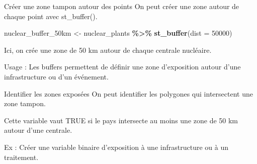 \documentclass[
  10pt,
  ignorenonframetext,
]{beamer}
\newenvironment{Shaded}{\begin{snugshade}}{\end{snugshade}}
\newcommand{\AttributeTok}[1]{\textcolor[rgb]{0.13,0.29,0.53}{#1}}
\newcommand{\DecValTok}[1]{\textcolor[rgb]{0.00,0.00,0.81}{#1}}
\newcommand{\FunctionTok}[1]{\textcolor[rgb]{0.13,0.29,0.53}{\textbf{#1}}}
\newcommand{\NormalTok}[1]{#1}
\newcommand{\OtherTok}[1]{\textcolor[rgb]{0.56,0.35,0.01}{#1}}
\newcommand{\SpecialCharTok}[1]{\textcolor[rgb]{0.81,0.36,0.00}{\textbf{#1}}}
\begin{document}
\begin{frame}[fragile]{Créer une zone tampon autour des points}
\label{cruxe9er-une-zone-tampon-autour-des-points}
On peut créer une zone autour de chaque point avec st\_buffer().

\begin{Shaded}
\begin{Highlighting}[]
\NormalTok{nuclear\_buffer\_50km }\OtherTok{\textless{}{-}}\NormalTok{ nuclear\_plants }\SpecialCharTok{\%\textgreater{}\%}
  \FunctionTok{st\_buffer}\NormalTok{(}\AttributeTok{dist =} \DecValTok{50000}\NormalTok{)}
\end{Highlighting}
\end{Shaded}

Ici, on crée une zone de 50 km autour de chaque centrale nucléaire.

Usage : Les buffers permettent de définir une zone d'exposition autour
d'une infrastructure ou d'un événement.
\end{frame}

\begin{frame}[fragile]{Identifier les zones exposées}
\label{identifier-les-zones-exposuxe9es}
On peut identifier les polygones qui intersectent une zone tampon.

\begin{Shaded}
\end{Shaded}

Cette variable vaut TRUE si le pays intersecte au moins une zone de 50
km autour d'une centrale.

Ex : Créer une variable binaire d'exposition à une infrastructure ou à
un traitement.
\end{frame}
\end{document}
